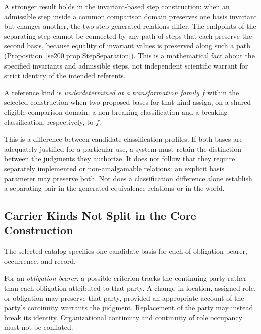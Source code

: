 A stronger result holds in the invariant-based step construction:
when an admissible step inside a common comparison domain preserves
one basis invariant but changes another, the two step-generated
relations differ.
The endpoints of the separating step cannot be connected by any path of
steps that each preserve the second basis, because equality of invariant
values is preserved along such a path
(Proposition~\ref{se200.prop.StepSeparation}).
This is a mathematical fact about the specified invariants and admissible steps,
not independent scientific warrant for strict identity of the intended referents.

\begin{definition}
  \label{se200.def.UnderdeterminedKind}
  A reference kind is \emph{underdetermined at a transformation family}
  $f$ within the selected construction when two proposed bases for that
  kind assign, on a shared eligible comparison domain, a non-breaking
  classification and a breaking classification, respectively, to $f$.
\end{definition}

This is a difference between candidate classification profiles.
If both bases are adequately justified for a particular use, a system must
retain the distinction between the judgments they authorize.
It does not follow that they require separately implemented or
non-amalgamable relations: an explicit basis parameter may preserve both.
Nor does a classification difference alone establish a separating pair
in the generated equivalence relations or in the world.

\subsection{Carrier Kinds Not Split in the Core Construction}
\label{subsec:core_unsplit_kinds}

The selected catalog specifies one candidate basis for each of
obligation-bearer, occurrence, and record.

For an \emph{obligation-bearer}, a possible criterion tracks the continuing
party rather than each obligation attributed to that party.
A change in location, assigned role, or obligation may preserve that party, provided
an appropriate account of the party's continuity warrants the judgment.
Replacement of the party may instead break its identity.
Organizational continuity and continuity of role occupancy must not be conflated.

